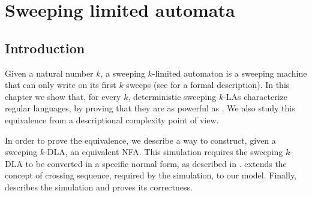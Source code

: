 \chapter{Sweeping limited automata}



\section{Introduction}
Given a natural number $k$, a sweeping $k$-limited automaton is a sweeping machine that can only write on its first $k$ sweeps (see  for a formal description).
In this chapter we show that, for every $k$, deterministic sweeping $k$-LAs characterize regular languages, by proving that they are as powerful as \NFAs. We also study this equivalence from a descriptional complexity point of view.

In order to prove the equivalence, we describe a way to construct, given a sweeping $k$-DLA, an equivalent NFA.
This simulation requires the sweeping $k$-DLA to be converted in a specific normal form, as described in .
 extends the concept of crossing sequence, required by the simulation, to our model.
Finally,  describes the simulation and proves its correctness.



